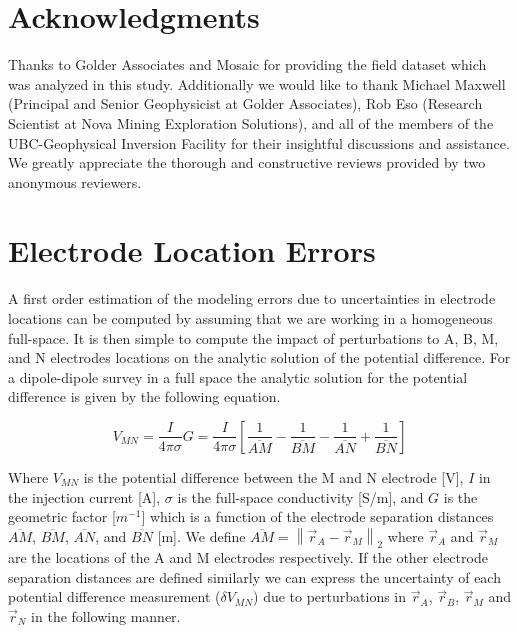 \documentclass[final,authoryear,5p,times,twocolumn]{elsarticle}
\begin{document}
\section{Acknowledgments}
\label{Acknowledgments}
Thanks to Golder Associates and Mosaic for providing the field dataset which was analyzed in this study. Additionally we would like to thank Michael Maxwell (Principal and Senior Geophysicist at Golder Associates), Rob Eso (Research Scientist at Nova Mining Exploration Solutions), and all of the members of the UBC-Geophysical Inversion Facility for their insightful discussions and assistance. We greatly appreciate the thorough and constructive reviews provided by two anonymous reviewers.

\appendix

\section{Electrode Location Errors}
\label{Appen:ElecLocErr}
A first order estimation of the modeling errors due to uncertainties in electrode locations can be computed by assuming that we are working in a homogeneous full-space. It is then simple to compute the impact of perturbations to A, B, M, and N electrodes locations on the analytic solution of the potential difference. For a dipole-dipole survey in a full space the analytic solution for the potential difference is given by the following equation.

\begin{equation}
 V_{MN} = \frac{I}{4 \pi \sigma} G = \frac{I}{4 \pi \sigma} \left[ \frac{1}{\overline{AM}} - \frac{1}{\overline{BM}} - \frac{1}{\overline{AN}} + \frac{1}{\overline{BN}} \right] 
\end{equation}

Where  $V_{MN}$ is the potential difference between the M and N electrode [V], $I$ in the injection current [A], $\sigma$ is the full-space conductivity [S/m], and $G$ is the geometric factor [$m^{-1}$] which is a function of the electrode separation distances $\overline{AM}$, $\overline{BM}$, $\overline{AN}$, and $\overline{BN}$ [m]. We define $\overline{AM} = \left\| \vec{r}_{A} - \vec{r}_{M} \right\|_{2}$ where $\vec{r}_{A}$ and $\vec{r}_{M}$ are the locations of the A and M electrodes respectively. If the other electrode separation distances are defined similarly we can express the uncertainty of each potential difference measurement ($\delta V_{MN}$) due to perturbations in $\vec{r}_{A}$, $\vec{r}_{B}$, $\vec{r}_{M}$ and $\vec{r}_{N}$ in the following manner.
\end{document}
